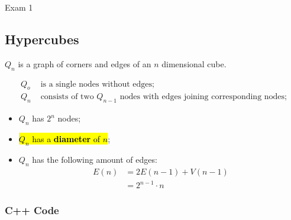 \documentclass{note}
\begin{document}
\begin{note}{Exam 1}
    \subsection{Hypercubes}

    $ Q_{n} $ is a graph of corners and edges of an $ n $ dimensional cube.

    \begin{align*}
        Q_{o} &\text{ is a single nodes without edges;}\\
        Q_{n} &\text{ consists of two } Q_{n - 1} \text{ nodes with edges joining corresponding nodes;}
    \end{align*}

    \begin{itemize}
        \item $ Q_{n} $ has $ 2^{n} $ nodes;
        \item \hl{$ Q_{n} $ has a \textbf{diameter} of $ n $};
        \item $ Q_{n} $ has the following amount of edges:
        \begin{align}
            E(n) &= 2 E(n - 1) + V(n - 1)\\
            &= 2^{n - 1} \cdot n
        \end{align}
    \end{itemize}

        \subsubsection{C++ Code}
        \texttt{}

\end{note}
\end{document}
